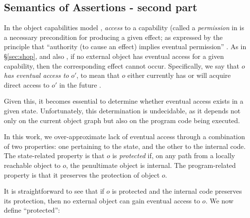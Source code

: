 \subsection{Semantics of Assertions - second part}  

\label{sect:protect}
In the object capabilities model \cite{MillerPhD}, \emph{access} to a capability (called a \emph{permission} in \cite{MillerPhD}
 is a necessary precondition  for producing a given effect;  as expressed by the principle that ``authority (to cause an effect) implies eventual permission'' \cite{permissionAuthority}.
As   in \S \ref{sec:shop}, and also \cite{OOPSLA22}, if no external object has eventual access for a given capability, then the corresponding effect cannot occur.
 Specifically,  we say that $o$ \emph{has eventual access to} $o'$, to mean  that $o$ either currently has or will acquire direct access to $o'$ in the future \cite{permissionAuthority}.



Given this, it becomes essential to determine whether eventual access exists in a given state. 
Unfortunately, this determination is undecidable, as it depends not only on the current object graph but also on the program code being executed.

In this work, we over-approximate lack of eventual access through a combination of two properties: one pertaining to the state, and the other to the internal code. 
The state-related property is that   $o$ is \emph{protected} if, on any path from a locally reachable object to $o$, the penultimate object  is internal. 
The program-related property is that it preserves the protection of object $o$.

It is straightforward to see that if $o$ is protected and the internal code preserves its protection, then no external object can gain eventual access to $o$.
We now define ``protected'':


